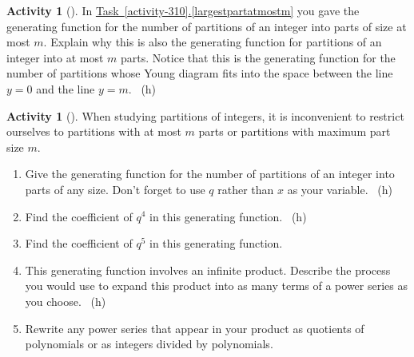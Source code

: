 \documentclass[10pt,]{book}
\theoremstyle{plain}
\theoremstyle{definition}
\theoremstyle{definition}
\theoremstyle{definition}
\newtheorem{activity}[project]{Activity}
\numberwithin{equation}{chapter}
\begin{document}
\begin{activity}[]\label{atmostmparts}
\hypertarget{p-1574}{}%
In \hyperref[largestpartatmostm]{Task~\ref{activity-310}.\ref{largestpartatmostm}} you gave the generating function for the number of partitions of an integer into parts of size at most \(m\). Explain why this is also the generating function for partitions of an integer into at most \(m\) parts. Notice that this is the generating function for the number of partitions whose Young diagram fits into the space between the line \(y=0\) and the line \(y=m\).%
~{\tiny (h)}\end{activity}
\begin{activity}[]\label{genfunpartitions}
\hypertarget{p-1577}{}%
When studying partitions of integers, it is inconvenient to restrict ourselves to partitions with at most \(m\) parts or partitions with maximum part size \(m\).%
\begin{enumerate}[font=\bfseries,label=(\alph*),ref=\alph*]
\item\label{task-271} \hypertarget{p-1578}{}%
Give the generating function for the number of partitions of an integer into parts of any size. Don't forget to use \(q\) rather than \(x\) as your variable.%
~{\tiny (h)}\item\label{task-272} \hypertarget{p-1581}{}%
Find the coefficient of \(q^4\) in this generating function.%
~{\tiny (h)}\item\label{task-273} \hypertarget{p-1584}{}%
Find the coefficient of \(q^5\) in this generating function.%
\item\label{task-274} \hypertarget{p-1586}{}%
This generating function involves an infinite product. Describe the process you would use to expand this product into as many terms of a power series as you choose.%
~{\tiny (h)}\item\label{task-275} \hypertarget{p-1589}{}%
Rewrite any power series that appear in your product as quotients of polynomials or as integers divided by polynomials.%
\end{enumerate}
\end{activity}
\end{document}
